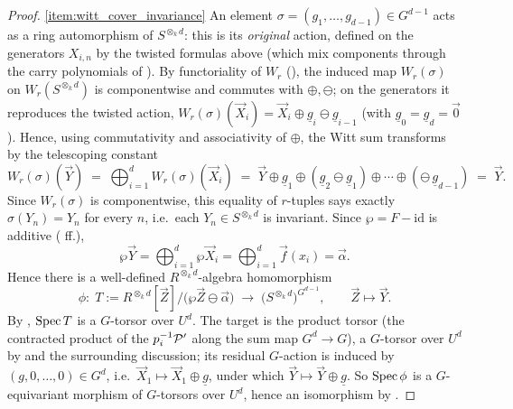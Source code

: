 \begin{proof}
    \ref{item:witt_cover_invariance} An element
    $\sigma = (g_1, \dots, g_{d-1}) \in G^{d-1}$ acts as a ring automorphism of
    $S^{\otimes_k d}$: this is its \emph{original} action, defined on the generators
    $X_{i,n}$ by the twisted formulas above (which mix components through the carry
    polynomials of ). By functoriality of $W_r$
    (), the induced map $W_r(\sigma)$ on
    $W_r(S^{\otimes_k d})$ is componentwise and commutes with $\oplus, \ominus$; on
    the generators it reproduces the twisted action,
    $W_r(\sigma)(\vec X_i) = \vec X_i \oplus \underline g_i \ominus \underline g_{i-1}$
    (with $\underline g_0 = \underline g_d = \vec 0$). Hence, using commutativity and
    associativity of $\oplus$, the Witt sum transforms by the telescoping constant
    \[
    W_r(\sigma)(\vec Y)
    \;=\; \bigoplus_{i=1}^{d} W_r(\sigma)(\vec X_i)
    \;=\; \vec Y \oplus \underline g_1 \oplus (\underline g_2 \ominus \underline g_1)
    \oplus \cdots \oplus (\ominus\, \underline g_{d-1})
    \;=\; \vec Y.
    \]
    Since $W_r(\sigma)$ is componentwise, this equality of $r$-tuples says exactly
    $\sigma(Y_n) = Y_n$ for every $n$, i.e.\ each $Y_n \in S^{\otimes_k d}$ is
    invariant. Since $\wp = F - \mathrm{id}$ is additive
    ( ff.),
    \[
    \wp \vec Y = \bigoplus_{i=1}^{d} \wp \vec X_i
    = \bigoplus_{i=1}^{d} \vec f(x_i) = \vec \alpha .
    \]
    Hence there is a well-defined $R^{\otimes_k d}$-algebra homomorphism
    \[
    \phi \colon\; T := R^{\otimes_k d}[\vec Z]\big/\bigl(\wp \vec Z \ominus \vec \alpha\bigr)
    \;\longrightarrow\; \bigl(S^{\otimes_k d}\bigr)^{G^{d-1}},
    \qquad \vec Z \mapsto \vec Y .
    \]
    By , $\operatorname{Spec} T$ is a $G$-torsor over $U^d$. The
    target is the product torsor (the contracted product of the $p_i^{-1}\mathcal{P}'$ along
    the sum map $G^d \to G$), a $G$-torsor over $U^d$ by
     and the surrounding discussion; its residual
    $G$-action is induced by $(g, 0, \dots, 0) \in G^d$, i.e.\
    $\vec X_1 \mapsto \vec X_1 \oplus \underline g$, under which
    $\vec Y \mapsto \vec Y \oplus \underline g$. So $\operatorname{Spec} \phi$ is a $G$-equivariant
    morphism of $G$-torsors over $U^d$, hence an isomorphism by
    .


\end{proof}

